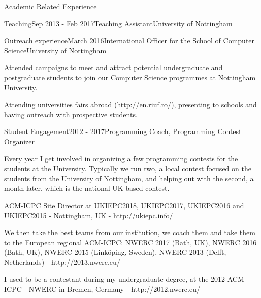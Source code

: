 \documentclass{resume} %
\begin{document}
\begin{rSection}{Academic Related Experience}
\begin{rSubsection}{Teaching}{Sep 2013 - Feb 2017}{Teaching Assistant}{University of Nottingham}
    \end{rSubsection}
\vspace{-1 mm}
    \begin{rSubsection}{Outreach experience}{March 2016}{International Officer for the School of Computer Science}{University of Nottingham}
        \item Attended campaigns to meet and attract potential undergraduate and postgraduate students to join our Computer Science programmes at Nottingham University.
        \item Attending universities fairs abroad (\url{http://en.riuf.ro/}), presenting to schools and having outreach with prospective students.
    \end{rSubsection}
\vspace{-1mm}
    \begin{rSubsection}{Student Engagement}{2012 - 2017}{Programming Coach, Programming Contest Organizer}{}
    	\item Every year I get involved in organizing a few programming contests for the students at the University. Typically we run two, a local contest focused on the students from the University of Nottingham, and helping out with the second, a month later, which is the national UK based contest.
    	\item  ACM-ICPC Site Director at UKIEPC2018, UKIEPC2017, UKIEPC2016 and UKIEPC2015 - Nottingham, UK - {http://ukiepc.info/}
    	\item  We then take the best teams from our institution, we coach them and take them to the European regional ACM-ICPC: NWERC 2017 (Bath, UK), NWERC 2016 (Bath, UK), NWERC 2015 (Linköping, Sweden), NWERC 2013 (Delft, Netherlands) - {http://2013.nwerc.eu/} 
    	\item I used to be a contestant during my undergraduate degree, at the 2012 ACM ICPC - NWERC in Bremen, Germany - {http://2012.nwerc.eu/}
    \end{rSubsection}
\end{rSection}
\vspace{-4 mm}
\end{document}
